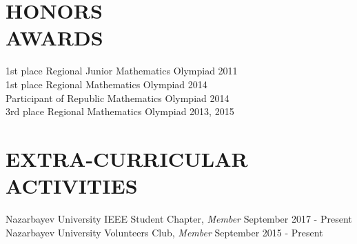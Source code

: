 \documentclass[margin, 10pt]{res} %
\begin{document}
\begin{resume}
\begin{itemize}
\end{itemize}
 

\section{HONORS \\ AWARDS}
1st place Regional Junior Mathematics Olympiad \hfill 2011 \\
1st place Regional Mathematics Olympiad  \hfill 2014 \\
Participant of Republic Mathematics Olympiad \hfill 2014 \\
3rd place Regional Mathematics Olympiad \hfill 2013, 2015 \\


\section{EXTRA-CURRICULAR \\ ACTIVITIES} 
Nazarbayev University IEEE Student Chapter, {\sl Member} \hfill September 2017 - Present \\
Nazarbayev University Volunteers Club, {\sl Member} \hfill September 2015 - Present\\

 


\end{resume}
\end{document}
